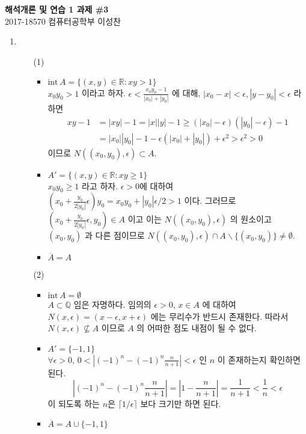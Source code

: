 \documentclass[12pt]{report}
\newcommand{\numl}[1]{\item[\large\textbf{\sffamily #1.}]}
\newcommand{\abs}[1]{\left|#1\right|}
\newcommand{\inte}{\mathrm{int}\,}
\newcommand{\bs}{\backslash}
\newcommand{\R}{\mathbb{R}}
\newcommand{\Q}{\mathbb{Q}}
\begin{document}
\begin{center}
\textbf{\Large 해석개론 및 연습 1 과제 \#3}\\
\large 2017-18570 컴퓨터공학부 이성찬
\end{center}
\begin{enumerate}
\numl{1}
\begin{enumerate}
	\item[(1)]
	\begin{itemize}
		\item $\inte A = \{(x, y) \in \R : xy > 1\}$\\
		$x_0y_0 > 1$ 이라고 하자. $\epsilon < \frac{x_0y_0-1}{\abs{x_0}+\abs{y_0}}$ 에 대해, $\abs{x_0 - x} < \epsilon, \abs{y-y_0}<\epsilon$ 라 하면
		$$\begin{aligned}
			xy - 1 &= \abs{xy} - 1 = \abs{x}\abs{y} - 1 \geq (\abs{x_0} - \epsilon)(\abs{y_0} - \epsilon) - 1\\
			&= \abs{x_0}\abs{y_0} - 1 - \epsilon(\abs{x_0} + \abs{y_0}) + \epsilon^2 > \epsilon^2 > 0
		\end{aligned}$$
		이므로 $N((x_0, y_0), \epsilon) \subset A$.
		\item $A' = \{(x, y) \in \R : xy \geq 1\}$\\
		$x_0y_0\geq 1$ 라고 하자. $\epsilon>0$에 대하여 $(x_0 + \frac{y_0}{2\abs{y_0}}\epsilon)y_0 = x_0y_0 + \abs{y_0}\epsilon/2 > 1$ 이다. 그러므로 $(x_0+\frac{y_0}{2\abs{y_0}}\epsilon, y_0)\in A$ 이고 이는 $N((x_0, y_0), \epsilon)$ 의 원소이고 $(x_0, y_0)$ 과 다른 점이므로 $N((x_0, y_0), \epsilon) \cap A\bs\{(x_0, y_0) \} \neq \emptyset$.
		\item $\overline{A} = A$
	\end{itemize}

	\item[(2)] 
	\begin{itemize}
		\item $\inte A = \emptyset$\\
		$A\subset \Q$ 임은 자명하다. 임의의 $\epsilon>0$, $x\in A$ 에 대하여 $N(x, \epsilon) = (x - \epsilon,  x + \epsilon)$ 에는 무리수가 반드시 존재한다. 따라서 $N(x, \epsilon) \nsubseteq A$ 이므로 $A$ 의 어떠한 점도 내점이 될 수 없다.
		\item $A' = \{-1, 1\}$\\
		$\forall \epsilon>0$, $0 < \abs{(-1)^n - (-1)^n \frac{n}{n+1}} < \epsilon$ 인 $n$ 이 존재하는지 확인하면 된다.
		$$\abs{(-1)^n - (-1)^n \frac{n}{n+1}} = \abs{1 - \frac{n}{n+1}} = \frac{1}{n+1} < \frac{1}{n} < \epsilon$$
		이 되도록 하는 $n$은 $\lceil1/\epsilon \rceil$ 보다 크기만 하면 된다.
		\item $\overline{A} = A \cup \{-1, 1\}$
	\end{itemize}


\end{enumerate}
\end{enumerate}
\end{document}
